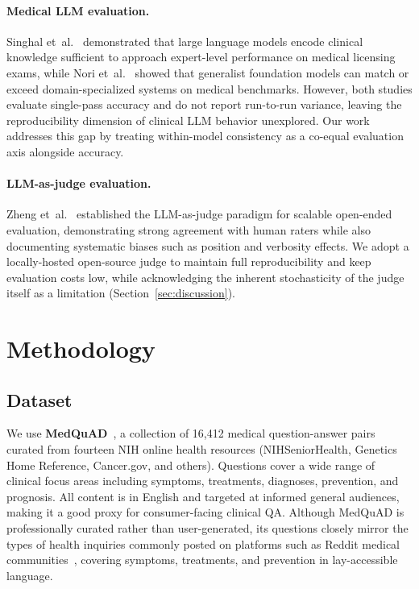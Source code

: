 \documentclass[11pt]{article}
\begin{document}
\paragraph{Medical LLM evaluation.}
Singhal et~al.~\cite{singhal2023large} demonstrated that large language
models encode clinical knowledge sufficient to approach expert-level
performance on medical licensing exams, while
Nori et~al.~\cite{nori2023gpt4med} showed that generalist foundation
models can match or exceed domain-specialized systems on medical
benchmarks.
However, both studies evaluate single-pass accuracy and do not report
run-to-run variance, leaving the reproducibility dimension of clinical
LLM behavior unexplored. Our work addresses this gap by treating
within-model consistency as a co-equal evaluation axis alongside
accuracy.

\paragraph{LLM-as-judge evaluation.}
Zheng et~al.~\cite{zheng2023judging} established the LLM-as-judge
paradigm for scalable open-ended evaluation, demonstrating strong
agreement with human raters while also documenting systematic biases
such as position and verbosity effects.
We adopt a locally-hosted open-source judge to maintain full
reproducibility and keep evaluation costs low, while acknowledging the
inherent stochasticity of the judge itself as a limitation
(Section~\ref{sec:discussion}).

\section{Methodology}

\subsection{Dataset}

We use \textbf{MedQuAD}~\cite{abacha2019mqa}, a collection of
16,412 medical question-answer pairs curated from fourteen NIH online
health resources (NIHSeniorHealth, Genetics Home Reference, Cancer.gov,
and others).
Questions cover a wide range of clinical focus areas including symptoms,
treatments, diagnoses, prevention, and prognosis.
All content is in English and targeted at informed general audiences,
making it a good proxy for consumer-facing clinical QA.
Although MedQuAD is professionally curated rather than user-generated,
its questions closely mirror the types of health inquiries commonly
posted on platforms such as Reddit medical
communities~\cite{sager2021reddit}, covering symptoms, treatments,
and prevention in lay-accessible language.
\end{document}
